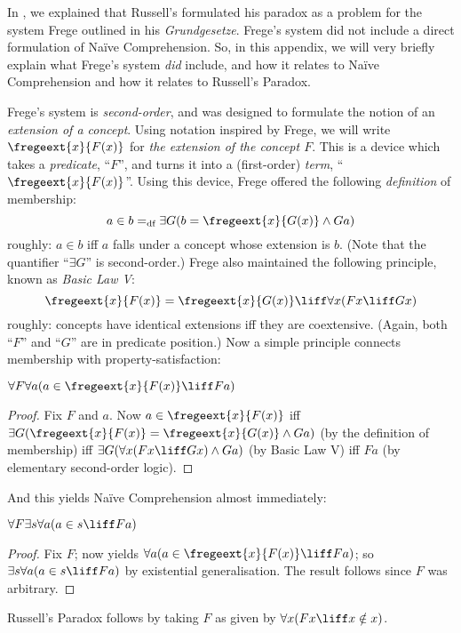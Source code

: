 \documentclass[../../../include/open-logic-section]{subfiles}
\begin{document}


In , we explained that Russell's formulated his
paradox as a problem for the system Frege outlined in his
\emph{Grundgesetze}. Frege's system did not include a direct
formulation of Na\"{i}ve Comprehension. So, in this appendix, we will
very briefly explain what Frege's system \emph{did} include, and how
it relates to Na\"ive Comprehension and how it relates to Russell's
Paradox.

Frege's system is \emph{second-order}, and was designed to formulate
the notion of an \emph{extension of a concept}. Using notation
inspired by Frege, we will write $\fregeext{x}{F(x)}$ for \emph{the extension
of the concept $F$}. This is a device which takes a \emph{predicate},
``$F$'', and turns it into a (first-order) \emph{term},
``$\fregeext{x}{F(x)}$''. Using this device, Frege offered the following
\emph{definition} of membership:
\[
	a \in b =_\text{df} \exists G(b = \fregeext{x}{G(x)} \land Ga)
\]
roughly: $a \in b$ iff $a$ falls under a concept whose extension is
$b$. (Note that the quantifier ``$\exists G$'' is second-order.) Frege
also maintained the following principle, known as \emph{Basic Law V}: 
$$\fregeext{x}{F(x)} = \fregeext{x}{G(x)} \liff \forall x (Fx \liff Gx)$$
roughly: concepts have identical extensions iff they are coextensive. (Again, both ``$F$'' and ``$G$'' are in predicate position.) Now a simple principle connects membership with property-satisfaction:

\begin{lem}
$\forall F \forall a(a \in \fregeext{x}{F(x)} \liff Fa)$
\end{lem}

\begin{proof} 
Fix $F$ and $a$. Now $a \in \fregeext{x}{F(x)}$ iff $\exists G(\fregeext{x}{F(x)}
= \fregeext{x}{G(x)} \land Ga)$ (by the definition of membership) iff
$\exists G(\forall x(Fx \liff Gx) \land Ga)$ (by Basic Law V) iff $Fa$
(by elementary second-order logic).
\end{proof}

And this yields Na\"ive Comprehension almost immediately:

\begin{lem}
$\forall F \exists s \forall a (a \in s \liff Fa)$
\end{lem}

\begin{proof}
Fix $F$; now  yields $\forall a (a \in
\fregeext{x}{F(x)} \liff Fa)$; so $\exists s\forall a(a \in s \liff Fa)$ by
existential generalisation. The result follows since $F$ was
arbitrary.
\end{proof}

Russell's Paradox follows by taking $F$ as given by $\forall x(Fx \liff x \notin x)$. 
\end{document}
